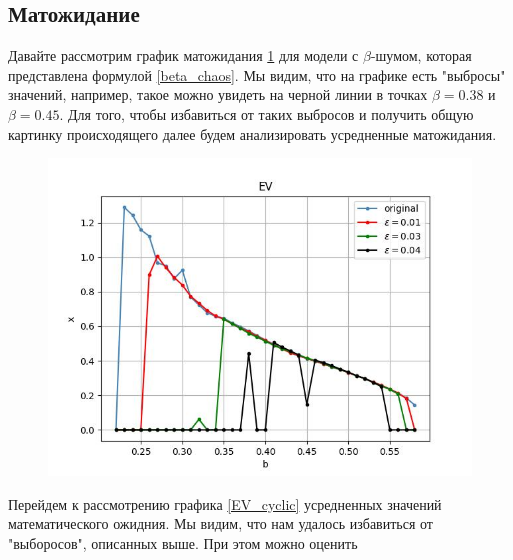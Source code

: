 \subsection{Матожидание}


    Давайте рассмотрим график матожидания \ref{EV} для модели с \(\beta\)-шумом, которая представлена формулой \ref{beta_chaos}. Мы видим, что на графике есть "выбросы" значений, например, такое можно увидеть на черной линии в точках \(\beta = 0.38\) и \(\beta = 0.45\). Для того, чтобы избавиться от таких выбросов и получить общую картинку происходящего далее будем анализировать усредненные матожидания.

        
    \begin{figure}
        \centering
        \includegraphics[width=\textwidth]{stochastic/images/EV.jpg}
        
        \captionsetup{justification=centering}
        \caption{}
        \label{EV}
    \end{figure}

    Перейдем к рассмотрению графика \ref{EV_cyclic} усредненных значений математического ожидния. Мы видим, что нам удалось избавиться от "выборосов", описанных выше. При этом можно оценить 
        
